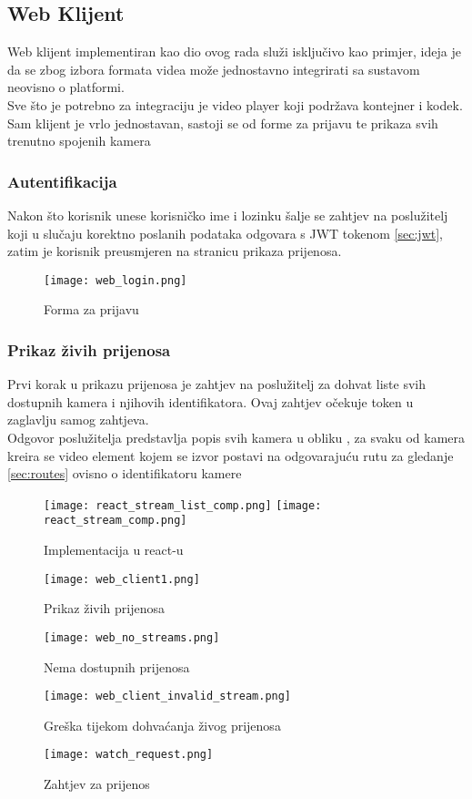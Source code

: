 \subsection{Web Klijent}
Web klijent implementiran kao dio ovog rada služi isključivo kao primjer, ideja je da se zbog izbora formata videa 
može jednostavno integrirati sa sustavom neovisno o platformi. \\
Sve što je potrebno za integraciju je video player koji podržava  kontejner i  kodek.
\paraBreak
Sam klijent je vrlo jednostavan, sastoji se od forme za prijavu te prikaza svih trenutno spojenih kamera

\subsubsection{Autentifikacija}
Nakon što korisnik unese korisničko ime i lozinku šalje se zahtjev na poslužitelj koji u slučaju korektno poslanih
podataka odgovara s JWT tokenom \ref{sec:jwt}, zatim je korisnik preusmjeren na stranicu prikaza prijenosa.

\begin{figure} [h]
  \texttt{[image: web\_login.png]}
  \caption{Forma za prijavu}
\end{figure}

\subsubsection{Prikaz živih prijenosa}
Prvi korak u prikazu prijenosa je zahtjev na poslužitelj za dohvat liste svih dostupnih kamera i njihovih identifikatora. 
Ovaj zahtjev očekuje  token u  zaglavlju samog zahtjeva.
\\
Odgovor poslužitelja predstavlja popis svih kamera u obliku , za svaku od kamera kreira se  
video element kojem se izvor postavi na odgovarajuću rutu za gledanje \ref{sec:routes} ovisno o identifikatoru kamere

\begin{figure}[h]
  \texttt{[image: react\_stream\_list\_comp.png]}
  \texttt{[image: react\_stream\_comp.png]}
  \caption{Implementacija u react-u}
\end{figure}

\begin{figure} [h]
  \texttt{[image: web\_client1.png]}
  \caption{Prikaz živih prijenosa}
\end{figure}

\begin{figure} [h]
  \texttt{[image: web\_no\_streams.png]}
  \caption{Nema dostupnih prijenosa}
\end{figure}

\begin{figure} [h]
  \texttt{[image: web\_client\_invalid\_stream.png]}
  \caption{Greška tijekom dohvaćanja živog prijenosa}
\end{figure}

\begin{figure} [h]
  \texttt{[image: watch\_request.png]}
  \caption{Zahtjev za prijenos}
\end{figure}
